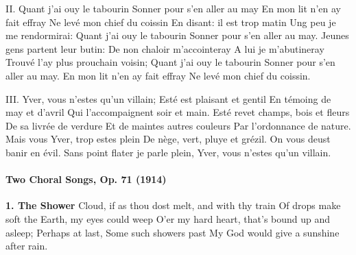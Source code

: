 \documentclass[11pt, ngermanm, titlepage]{article}
\begin{document}
\begin{multicols}{2}
	II. Quant j'ai ouy le tabourin\newline
	Sonner pour s'en aller au may\newline
	En mon lit n'en ay fait effray\newline
	Ne levé mon chief du coissin\newline
	En disant: il est trop matin\newline
	Ung peu je me rendormirai:\newline
	Quant j'ai ouy le tabourin\newline
	Sonner pour s'en aller au may.\newline
	Jeunes gens partent leur butin:\newline
	De non chaloir m'accointeray\newline
	A lui je m'abutineray\newline
	Trouvé l'ay plus prouchain voisin;\newline
	Quant j'ai ouy le tabourin\newline
	Sonner pour s'en aller au may.\newline
	En mon lit n'en ay fait effray\newline
	Ne levé mon chief du coissin.\newline
	
	III. Yver, vous n'estes qu'un villain;\newline
	Esté est plaisant et gentil\newline
	En témoing de may et d'avril\newline
	Qui l'accompaignent soir et main.\newline
	Esté revet champs, bois et fleurs\newline
	De sa livrée de verdure\newline
	Et de maintes autres couleurs\newline
	Par l'ordonnance de nature.\newline
	Mais vous Yver, trop estes plein\newline
	De nège, vert, pluye et grézil.\newline
	On vous deust banir en évil.\newline
	Sans point flater je parle plein,\newline
	Yver, vous n'estes qu'un villain.\newline
	
	\paragraph{Two Choral Songs, Op. 71 (1914)\newline}
	\textbf{1. The Shower}\newline
	Cloud, if as thou dost melt, and with thy train\newline
	Of drops make soft the Earth, my eyes could weep\newline
	O'er my hard heart, that's bound up and asleep;\newline
	Perhaps at last,\newline
	Some such showers past\newline
	My God would give a sunshine after rain.\newline
	

\end{multicols}
\end{document}
